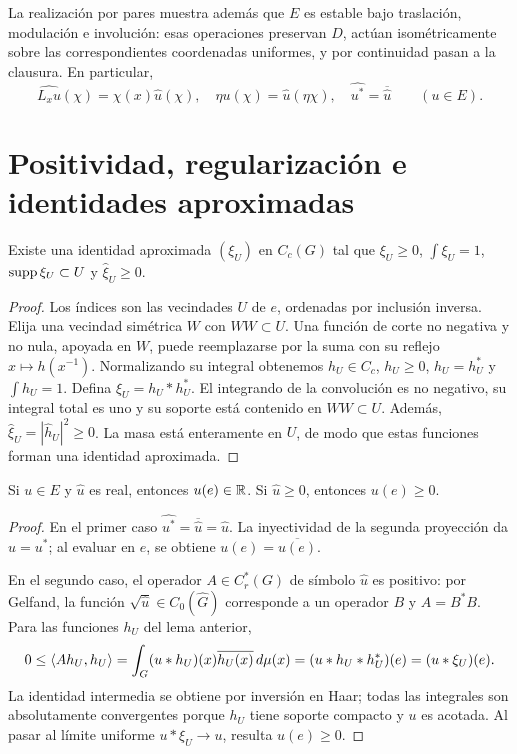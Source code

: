 La realización por pares muestra además que $E$ es estable bajo traslación, modulación e involución: esas operaciones preservan $D$, actúan isométricamente sobre las correspondientes coordenadas uniformes, y por continuidad pasan a la clausura. En particular,
\[
 \widehat{L_xu}(\chi)=\chi(x)\widehat u(\chi),\quad
 \widehat{\eta u}(\chi)=\widehat u(\eta\chi),\quad
 \widehat{u^*}=\overline{\widehat u}
 \qquad(u\in E).
\]

\section{Positividad, regularización e identidades aproximadas}
\begin{lema}\label{v4:dirac-positivo}
Existe una identidad aproximada $(\xi_U)$ en $C_c(G)$ tal que $\xi_U\ge0$, $\int\xi_U=1$, $\operatorname{supp}\xi_U\subset U$ y $\widehat\xi_U\ge0$.
\end{lema}
\begin{proof}
Los índices son las vecindades $U$ de $e$, ordenadas por inclusión inversa. Elija una vecindad simétrica $W$ con $WW\subset U$. Una función de corte no negativa y no nula, apoyada en $W$, puede reemplazarse por la suma con su reflejo $x\mapsto h(x^{-1})$. Normalizando su integral obtenemos $h_U\in C_c$, $h_U\ge0$, $h_U=h_U^*$ y $\int h_U=1$. Defina $\xi_U=h_U*h_U^*$. El integrando de la convolución es no negativo, su integral total es uno y su soporte está contenido en $WW\subset U$. Además,
$\widehat\xi_U=|\widehat h_U|^2\ge0$.
La masa está enteramente en $U$, de modo que estas funciones forman una identidad aproximada.
\end{proof}

\begin{lema}\label{v4:positividad-identidad}
Si $u\in E$ y $\widehat u$ es real, entonces $u(e)\in\mathbb R$. Si $\widehat u\ge0$, entonces $u(e)\ge0$.
\end{lema}
\begin{proof}
En el primer caso $\widehat{u^*}=\overline{\widehat u}=\widehat u$. La inyectividad de la segunda proyección da $u=u^*$; al evaluar en $e$, se obtiene $u(e)=\overline{u(e)}$.

En el segundo caso, el operador $A\in C_r^*(G)$ de símbolo $\widehat u$ es positivo: por Gelfand, la función $\sqrt{\widehat u}\in C_0(\widehat G)$ corresponde a un operador $B$ y $A=B^*B$. Para las funciones $h_U$ del lema anterior,
\[
 0\le\left\langle Ah_U,h_U\right\rangle
 =\int_G(u*h_U)(x)\overline{h_U(x)}\,d\mu(x)
 =(u*h_U*h_U^*)(e)=(u*\xi_U)(e).
\]
La identidad intermedia se obtiene por inversión en Haar; todas las integrales son absolutamente convergentes porque $h_U$ tiene soporte compacto y $u$ es acotada. Al pasar al límite uniforme $u*\xi_U\to u$, resulta $u(e)\ge0$.
\end{proof}

